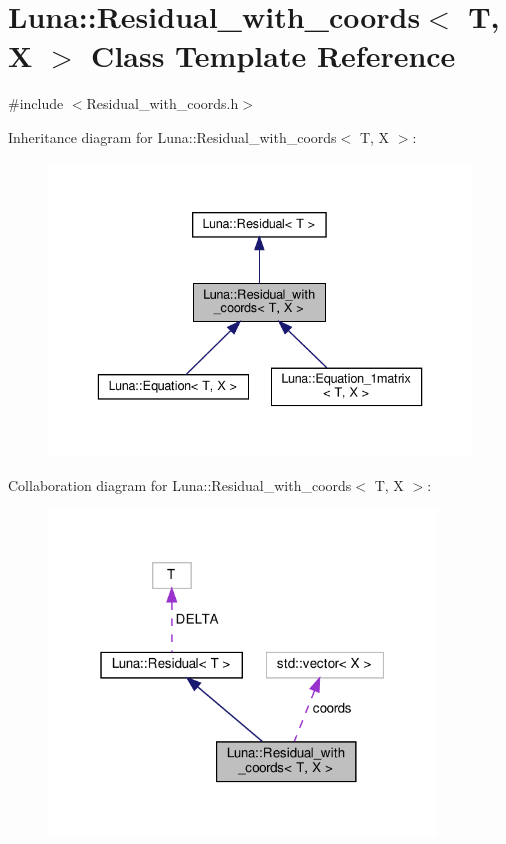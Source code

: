 \hypertarget{classLuna_1_1Residual__with__coords}{}\section{Luna\+:\+:Residual\+\_\+with\+\_\+coords$<$ T, X $>$ Class Template Reference}
\label{classLuna_1_1Residual__with__coords}


{\ttfamily \#include $<$Residual\+\_\+with\+\_\+coords.\+h$>$}



Inheritance diagram for Luna\+:\+:Residual\+\_\+with\+\_\+coords$<$ T, X $>$\+:\nopagebreak
\begin{figure}[H]
\begin{center}
\leavevmode
\includegraphics[width=336pt]{classLuna_1_1Residual__with__coords__inherit__graph}
\end{center}
\end{figure}


Collaboration diagram for Luna\+:\+:Residual\+\_\+with\+\_\+coords$<$ T, X $>$\+:\nopagebreak
\begin{figure}[H]
\begin{center}
\leavevmode
\includegraphics[width=292pt]{classLuna_1_1Residual__with__coords__coll__graph}
\end{center}
\end{figure}
